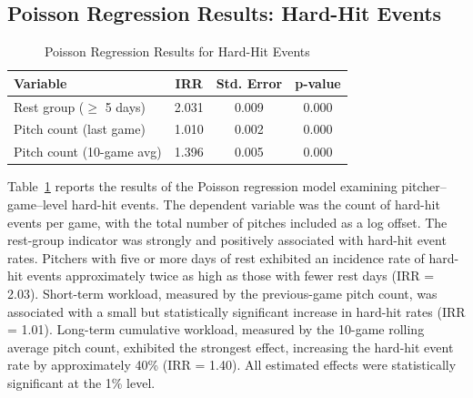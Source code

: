 \documentclass[12pt, letterpaper]{article}
\begin{document}
\subsection{Poisson Regression Results: Hard-Hit Events}
\begin{table}[htbp]
\centering
\begin{tabular}{lccc}
\hline
Variable & IRR & Std. Error & p-value \\
\hline
Rest group ($\geq$ 5 days) & 2.031 & 0.009 & 0.000 \\
Pitch count (last game) & 1.010 & 0.002 & 0.000 \\
Pitch count (10-game avg) & 1.396 & 0.005 & 0.000 \\
\hline
\end{tabular}
\caption{Poisson Regression Results for Hard-Hit Events}
\label{tab:hardhit}
\end{table}
Table~\ref{tab:hardhit} reports the results of the Poisson regression model examining pitcher--game–level hard-hit events. The dependent variable was the count of hard-hit events per game, with the total number of pitches included as a log offset.
The rest-group indicator was strongly and positively associated with hard-hit event rates. Pitchers with five or more days of rest exhibited an incidence rate of hard-hit events approximately twice as high as those with fewer rest days (IRR = 2.03). 
Short-term workload, measured by the previous-game pitch count, was associated with a small but statistically significant increase in hard-hit rates (IRR = 1.01). Long-term cumulative workload, measured by the 10-game rolling average pitch count, exhibited the strongest effect, increasing the hard-hit event rate by approximately 40\% (IRR = 1.40). All estimated effects were statistically significant at the 1\% level.
\end{document}
